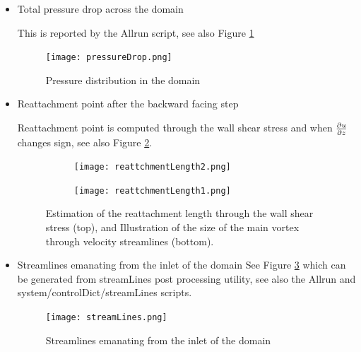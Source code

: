 \documentclass[10pt,letterpaper]{article}
\newcommand{\mfont}[1]{{\fontfamily{qcr}\selectfont #1}}
\begin{document}
\begin{itemize}
	\item Total pressure drop across the domain
	
		{		\color{mblue}
		This is reported by the \mfont{Allrun} script, see also Figure \ref{fig:p}
		}
	\begin{figure}[H]
		\begin{center}
			\texttt{[image: pressureDrop.png]}
		\end{center}
		\caption{Pressure distribution in the domain}
		\label{fig:p}
	\end{figure}
	\item Reattachment point after the backward facing step
	
	{\color{mblue}
		Reattachment point is computed through the wall shear stress and when $\frac{\partial \boldmath u}{\partial z}$ changes sign, see also Figure \ref{fig:reattachment}. 
	}
\begin{figure}[H]
		\begin{subfigure}{0.8\columnwidth}	
		\centering
		\texttt{[image: reattchmentLength2.png]}
	\end{subfigure}
	\begin{subfigure}{0.8\columnwidth}	
		\centering
		\texttt{[image: reattchmentLength1.png]}
	\end{subfigure}
	\caption{Estimation of the reattachment length through the wall shear stress (top), and Illustration of the size of the main vortex through velocity streamlines (bottom). }
	\label{fig:reattachment}
\end{figure}

	\item Streamlines emanating from the inlet of the domain
		{\color{mblue}
		 See Figure \ref{fig:streamlines} which can be generated from \mfont{streamLines} post processing utility, see also the \mfont{Allrun} and \mfont{system\slash controlDict\slash streamLines}  scripts.  
	}
	\begin{figure}[H]
		\begin{center}
			\texttt{[image: streamLines.png]}
		\end{center}
		\caption{Streamlines emanating from the inlet of the domain}
		\label{fig:streamlines}
	\end{figure}

\end{itemize}
\end{document}
